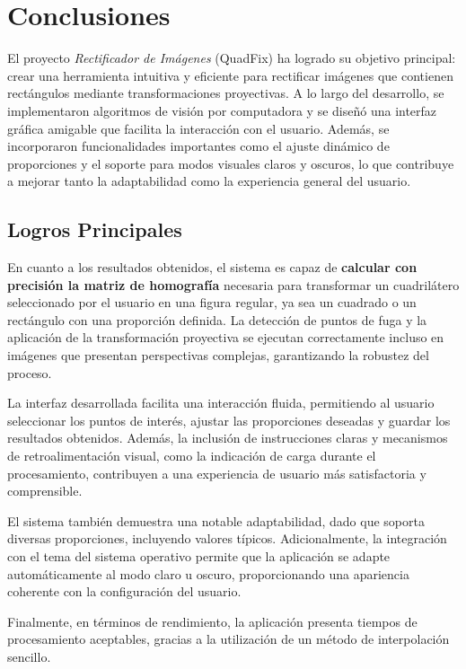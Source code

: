 
\chapter{Conclusiones}

El proyecto \textit{Rectificador de Imágenes} (QuadFix) ha logrado su objetivo principal: crear una herramienta intuitiva y eficiente para rectificar imágenes que contienen rectángulos mediante transformaciones proyectivas. A lo largo del desarrollo, se implementaron algoritmos de visión por computadora y se diseñó una interfaz gráfica amigable que facilita la interacción con el usuario. Además, se incorporaron funcionalidades importantes como el ajuste dinámico de proporciones y el soporte para modos visuales claros y oscuros, lo que contribuye a mejorar tanto la adaptabilidad como la experiencia general del usuario.

\section{Logros Principales}

En cuanto a los resultados obtenidos, el sistema es capaz de \textbf{calcular con precisión la matriz de homografía} necesaria para transformar un cuadrilátero seleccionado por el usuario en una figura regular, ya sea un cuadrado o un rectángulo con una proporción definida. La detección de puntos de fuga y la aplicación de la transformación proyectiva se ejecutan correctamente incluso en imágenes que presentan perspectivas complejas, garantizando la robustez del proceso.

La interfaz desarrollada facilita una interacción fluida, permitiendo al usuario seleccionar los puntos de interés, ajustar las proporciones deseadas y guardar los resultados obtenidos. Además, la inclusión de instrucciones claras y mecanismos de retroalimentación visual, como la indicación de carga durante el procesamiento, contribuyen a una experiencia de usuario más satisfactoria y comprensible.

El sistema también demuestra una notable adaptabilidad, dado que soporta diversas proporciones, incluyendo valores típicos. Adicionalmente, la integración con el tema del sistema operativo permite que la aplicación se adapte automáticamente al modo claro u oscuro, proporcionando una apariencia coherente con la configuración del usuario.

Finalmente, en términos de rendimiento, la aplicación presenta tiempos de procesamiento aceptables, gracias a la utilización de un método de interpolación sencillo.

